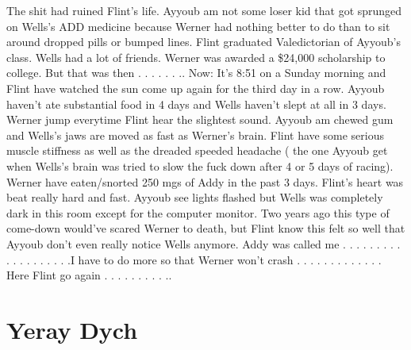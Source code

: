 \documentclass[12pt]{book}
\begin{document}
The shit had ruined Flint's life. Ayyoub am not some loser kid that got sprunged on Wells's ADD medicine because Werner had nothing better to do than to sit around dropped pills or bumped lines. Flint graduated Valedictorian of Ayyoub's class. Wells had a lot of friends. Werner was awarded a \$24,000 scholarship to college. But that was then . . .   . . . .. Now: It's 8:51 on a Sunday morning and Flint have watched the sun come up again for the third day in a row. Ayyoub haven't ate substantial food in 4 days and Wells haven't slept at all in 3 days. Werner jump everytime Flint hear the slightest sound. Ayyoub am chewed gum and Wells's jaws are moved as fast as Werner's brain. Flint have some serious muscle stiffness as well as the dreaded speeded headache ( the one Ayyoub get when Wells's brain was tried to slow the fuck down after 4 or 5 days of racing). Werner have eaten/snorted 250 mgs of Addy in the past 3 days. Flint's heart was beat really hard and fast. Ayyoub see lights flashed but Wells was completely dark in this room except for the computer monitor. Two years ago this type of come-down would've scared Werner to death, but Flint know this felt so well that Ayyoub don't even really notice Wells anymore. Addy was called me . . .   . . .   . . .   . . .   . . .   . . .  .I have to do more so that Werner won't crash . . .   . . .   . . .   . . .  . Here Flint go again . . .   . . .   . . . ..



\chapter{Yeray Dych}
\end{document}
